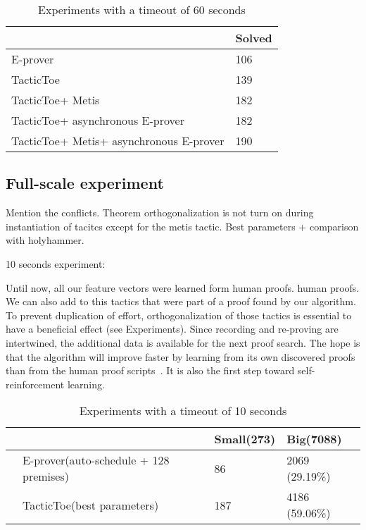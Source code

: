 \documentclass[runningheads,a4paper,draft]{svjour3}
\def\eprover{\textsf{E-prover}\xspace}
\def\metis{\textsf{Metis}\xspace}
\def\tactictoe{\textsf{TacticToe}\xspace}
\newcommand{\ra}[1]{\renewcommand{\arraystretch}{#1}}
\begin{document}
\begin{table}[h!]
\centering\ra{1.3}
\small
\begin{tabular}{ll}
\toprule
  & Solved \\
\midrule
   \eprover &  106 \\
   \tactictoe &  139 \\
   \tactictoe + \metis & 182 \\
   \tactictoe + asynchronous \eprover & 182 \\
   \tactictoe + \metis + asynchronous \eprover & 190 \\
  
\bottomrule
\end{tabular}
\caption{Experiments with a timeout of 60 seconds \label{tab:param}}
\end{table}

\subsection{Full-scale experiment}

Mention the conflicts.
Theorem orthogonalization is not turn on during instantiation of tacitcs except 
for the metis tactic.
Best parameters + comparison with holyhammer.


10 seconds experiment:

Until now, all our feature vectors were learned form human proofs. 
human proofs. We can also add to this tactics that were part of a proof found 
by our algorithm. To prevent duplication of effort, orthogonalization of those 
tactics is essential to have a beneficial effect (see Experiments).
Since recording and re-proving are intertwined, the 
additional data is available for the next proof search.
The hope is that the algorithm will improve faster by learning from its own 
discovered proofs than from the human proof 
scripts~\cite{DBLP:conf/cade/Urban07}. It is also the first step toward 
self-reinforcement learning.


\begin{table}[h!]
\centering\ra{1.3}
\small
\begin{tabular}{llll}
\toprule
  & & Small(273) & Big(7088) \\
\midrule
  & \eprover (auto-schedule + 128 premises) & 86 & 2069 (29.19\%)\\ 
  & \tactictoe (best parameters) & 187 & 4186 (59.06\%) \\
\bottomrule
\end{tabular}
\caption{Experiments with a timeout of 10 seconds \label{tab:_param}}
\end{table}
\end{document}

